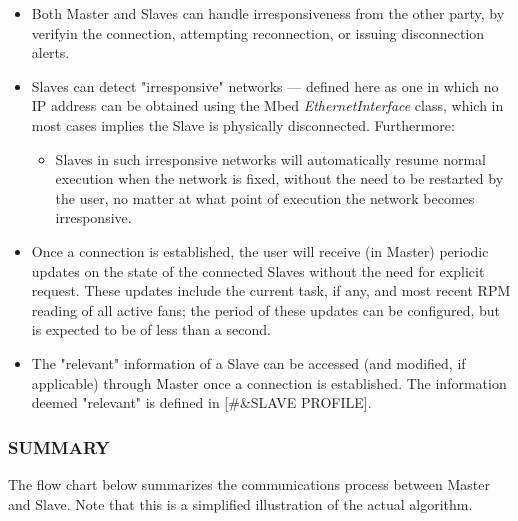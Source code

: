 \documentclass{article}
\begin{document}
\begin{itemize}
	
	\item Both Master and Slaves can handle irresponsiveness from the other party, by verifyin the connection, attempting reconnection, or issuing disconnection alerts.
	
	\item Slaves can detect "irresponsive" networks --- defined here as one in which no IP address can be obtained using the Mbed \textit{EthernetInterface} class, which in most cases implies the Slave is physically disconnected. Furthermore:
	
	\begin{itemize}
		\item Slaves in such irresponsive networks will automatically resume normal execution when the network is fixed, without the need to be restarted by the user, no matter at what point of execution the network becomes irresponsive.
	\end{itemize}

	\item Once a connection is established, the user will receive (in Master) periodic updates on the state of the connected Slaves without the need for explicit request. These updates include the current task, if any, and most recent RPM reading of all active fans; the period of these updates can be configured, but is expected to be of less than a second.
	
	\item The "relevant" information of a Slave can be accessed (and modified, if applicable) through Master once a connection is established. The information deemed "relevant" is defined in [\#\&SLAVE PROFILE].
	
\end{itemize}


\subsubsection{SUMMARY}

The flow chart below summarizes the communications process between Master and Slave. Note that this is a simplified illustration of the actual algorithm.
\end{document}
